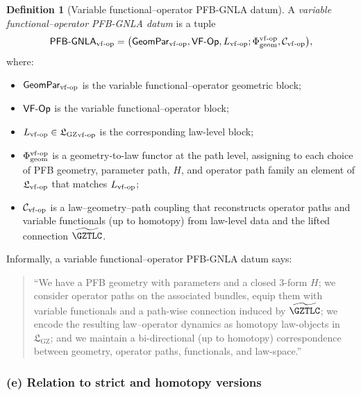 \documentclass[11pt]{book}
\theoremstyle{plain}
\theoremstyle{definition}
\newtheorem{definition}[theorem]{Definition} \theoremstyle{remark}
\newcommand{\GZLS}{\ensuremath{\mathfrak{L}_{\mathrm{GZ}}}}       \newcommand{\GZLT}{\ensuremath{M_{!w}}}                           \newcommand{\GZLOC}{\ensuremath{A_M}}                             \newcommand{\GZLCurv}{\ensuremath{\mathcal{F}_{\mathrm{law}}}}
\begin{document}
\begin{definition}[Variable functional--operator PFB-GNLA datum]
A \emph{variable functional--operator PFB-GNLA datum} is a tuple
  \[
    \mathsf{PFB\text- GNLA}_{\mathrm{vf\text- op}}
    =
    \bigl(
      \mathsf{GeomPar}_{\mathrm{vf\text- op}},
      \mathsf{VF\text- Op},
      L_{\mathrm{vf\text- op}};
      \Phi_{\mathrm{geom}}^{\mathrm{vf\text- op}},
      \mathcal{C}_{\mathrm{vf\text- op}}
    \bigr),
  \]
  where:
  \begin{itemize}
    \item $\mathsf{GeomPar}_{\mathrm{vf\text- op}}$ is the variable
          functional--operator geometric block;
    \item $\mathsf{VF\text- Op}$ is the variable functional--operator
          block;
    \item $L_{\mathrm{vf\text- op}}\in{\GZLS}_{\mathrm{vf\text- op}}$ is
          the corresponding law-level block;
    \item $\Phi_{\mathrm{geom}}^{\mathrm{vf\text- op}}$ is a
          geometry-to-law functor at the path level, assigning to
          each choice of PFB geometry, parameter path, $H$, and
          operator path family an element of
          $\mathfrak{L}_{\mathrm{vf\text- op}}$ that matches
          $L_{\mathrm{vf\text- op}}$;
    \item $\mathcal{C}_{\mathrm{vf\text- op}}$ is a law–geometry–path
          coupling that reconstructs operator paths and variable
          functionals (up to homotopy) from law-level data and the
          lifted connection $\widetilde{\GZTLC}$.
  \end{itemize}
\end{definition}

Informally, a variable functional--operator PFB-GNLA datum says:

\begin{quote}
  “We have a PFB geometry with parameters and a closed 3-form $H$; we
   consider operator paths on the associated bundles, equip them with
   variable functionals and a path-wise connection induced by
   $\widetilde{\GZTLC}$; we encode the resulting law–operator dynamics
   as homotopy law-objects in \GZLS; and we maintain a bi-directional
   (up to homotopy) correspondence between geometry, operator paths,
   functionals, and law-space.”
\end{quote}



\subsubsection*{(e) Relation to strict and homotopy versions}
\end{document}
